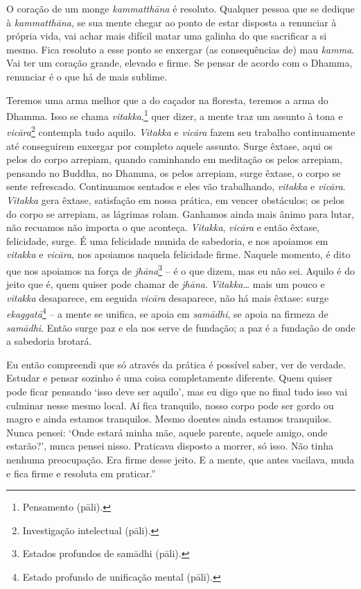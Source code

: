 O coração de um monge \emph{kammatthāna} é resoluto. Qualquer pessoa que
se dedique à \emph{kammatthāna}, se sua mente chegar ao ponto de estar
disposta a renunciar à própria vida, vai achar mais difícil matar uma
galinha do que sacrificar a si mesmo. Fica resoluto a esse ponto se
enxergar (as consequências de) mau \emph{kamma}. Vai ter um coração
grande, elevado e firme. Se pensar de acordo com o Dhamma, renunciar é o
que há de mais sublime.

Teremos uma arma melhor que a do caçador na floresta, teremos a arma do
Dhamma. Isso se chama \emph{vitakka},\footnote{Pensamento (pāli).} quer
dizer, a mente traz um assunto à tona e \emph{vicāra}\footnote{Investigação
  intelectual (pāli).} contempla tudo aquilo. \emph{Vitakka} e
\emph{vicāra} fazem seu trabalho continuamente até conseguirem enxergar
por completo aquele assunto. Surge êxtase, aqui os pelos do corpo
arrepiam, quando caminhando em meditação os pelos arrepiam, pensando no
Buddha, no Dhamma, os pelos arrepiam, surge êxtase, o corpo se sente
refrescado. Continuamos sentados e eles vão trabalhando, \emph{vitakka}
e \emph{vicāra}. \emph{Vitakka} gera êxtase, satisfação em nossa
prática, em vencer obstáculos; os pelos do corpo se arrepiam, as
lágrimas rolam. Ganhamos ainda mais ânimo para lutar, não recuamos não
importa o que aconteça. \emph{Vitakka}, \emph{vicāra} e então êxtase,
felicidade, surge. É uma felicidade munida de sabedoria, e nos apoiamos
em \emph{vitakka} e \emph{vicāra}, nos apoiamos naquela felicidade
firme. Naquele momento, é dito que nos apoiamos na força de
\emph{jhāna}\footnote{Estados profundos de samādhi (pāli).} -- é o que
dizem, mas eu não sei. Aquilo é do jeito que é, quem quiser pode chamar
de \emph{jhāna}. \emph{Vitakka\ldots{}} mais um pouco e \emph{vitakka}
desaparece, em seguida \emph{vicāra} desaparece, não há mais êxtase:
surge \emph{ekaggatā}\footnote{Estado profundo de unificação mental
  (pāli).} -- a mente se unifica, se apoia em \emph{samādhi}, se apoia
na firmeza de \emph{samādhi}. Então surge paz e ela nos serve de
fundação; a paz é a fundação de onde a sabedoria brotará.

Eu então compreendi que só através da prática é possível saber, ver de
verdade. Estudar e pensar sozinho é uma coisa completamente diferente.
Quem quiser pode ficar pensando `isso deve ser aquilo', mas eu digo que
no final tudo isso vai culminar nesse mesmo local. Aí fica tranquilo,
nosso corpo pode ser gordo ou magro e ainda estamos tranquilos. Mesmo
doentes ainda estamos tranquilos. Nunca pensei: `Onde estará minha mãe,
aquele parente, aquele amigo, onde estarão?', nunca pensei nisso.
Praticava disposto a morrer, só isso. Não tinha nenhuma preocupação. Era
firme desse jeito. E a mente, que antes vacilava, muda e fica firme e
resoluta em praticar.''

